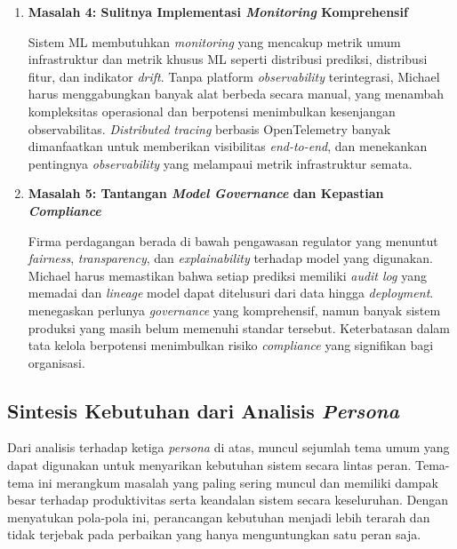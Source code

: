 \begin{enumerate}
\begin{enumerate}[label=\alph*)]
        \vspace{0.5em}

        \item \textbf{Masalah 4: Sulitnya Implementasi \textit{Monitoring} Komprehensif}
        
        Sistem ML membutuhkan \textit{monitoring} yang mencakup metrik umum infrastruktur dan metrik khusus ML seperti distribusi prediksi, distribusi fitur, dan indikator \textit{drift}. Tanpa platform \textit{observability} terintegrasi, Michael harus menggabungkan banyak alat berbeda secara manual, yang menambah kompleksitas operasional dan berpotensi menimbulkan kesenjangan observabilitas. \textit{Distributed tracing} berbasis OpenTelemetry banyak dimanfaatkan untuk memberikan visibilitas \textit{end-to-end}, dan \textcite{shankar2022operationalizing} menekankan pentingnya \textit{observability} yang melampaui metrik infrastruktur semata.

        \vspace{0.5em}

        \item \textbf{Masalah 5: Tantangan \textit{Model Governance} dan Kepastian \textit{Compliance}}
        
        Firma perdagangan berada di bawah pengawasan regulator yang menuntut \textit{fairness}, \textit{transparency}, dan \textit{explainability} terhadap model yang digunakan. Michael harus memastikan bahwa setiap prediksi memiliki \textit{audit log} yang memadai dan \textit{lineage} model dapat ditelusuri dari data hingga \textit{deployment}. \textcite{stoyanovich2020responsible} menegaskan perlunya \textit{governance} yang komprehensif, namun banyak sistem produksi yang masih belum memenuhi standar tersebut. Keterbatasan dalam tata kelola berpotensi menimbulkan risiko \textit{compliance} yang signifikan bagi organisasi.
    \end{enumerate}
\end{enumerate}

\subsection{Sintesis Kebutuhan dari Analisis \textit{Persona}}

Dari analisis terhadap ketiga \textit{persona} di atas, muncul sejumlah tema umum yang dapat digunakan untuk menyarikan kebutuhan sistem secara lintas peran. Tema-tema ini merangkum masalah yang paling sering muncul dan memiliki dampak besar terhadap produktivitas serta keandalan sistem secara keseluruhan. Dengan menyatukan pola-pola ini, perancangan kebutuhan menjadi lebih terarah dan tidak terjebak pada perbaikan yang hanya menguntungkan satu peran saja.

